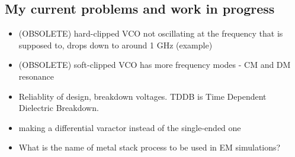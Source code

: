 \documentclass{article}
\begin{document}








\subsection*{My current problems and work in progress}

\begin{itemize}
	\item (OBSOLETE) hard-clipped VCO not oscillating at the frequency that is supposed to, drops down to around 1 GHz (example)
	\item (OBSOLETE) soft-clipped VCO has more frequency modes - CM and DM resonance
	\item Reliablity of design, breakdown voltages. TDDB is Time Dependent Dielectric Breakdown. 
	\item making a differential varactor instead of the single-ended one
	\item What is the name of metal stack process to be used in EM simulations?
\end{itemize}
\end{document}
